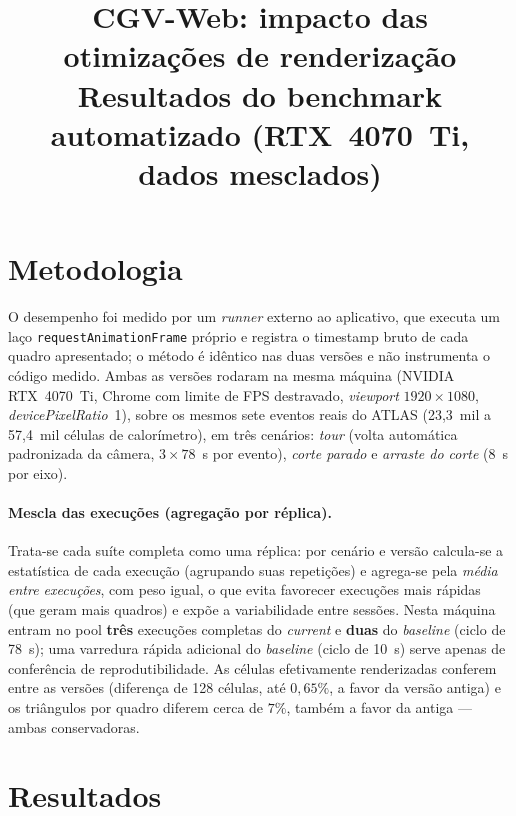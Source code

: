 \documentclass[11pt,a4paper]{article}
\title{CGV-Web: impacto das otimiza\c{c}\~oes de renderiza\c{c}\~ao\\ \large Resultados do benchmark automatizado (RTX~4070~Ti, dados mesclados)}
\author{}
\date{}
\begin{document}
\maketitle

\section{Metodologia}

O desempenho foi medido por um \emph{runner} externo ao aplicativo, que executa um la\c{c}o
\texttt{request\-Animation\-Frame} pr\'oprio e registra o timestamp bruto de cada quadro
apresentado; o m\'etodo \'e id\^entico nas duas vers\~oes e n\~ao instrumenta o c\'odigo medido.
Ambas as vers\~oes rodaram na mesma m\'aquina (NVIDIA RTX~4070~Ti, Chrome com limite de FPS
destravado, \emph{viewport} $1920\times1080$, \emph{devicePixelRatio}~1), sobre os mesmos sete
eventos reais do ATLAS (23{,}3~mil a 57{,}4~mil c\'elulas de calor\'imetro), em tr\^es
cen\'arios: \emph{tour} (volta autom\'atica padronizada da c\^amera, $3\times78$~s por evento),
\emph{corte parado} e \emph{arraste do corte} (8~s por eixo).

\paragraph{Mescla das execu\c{c}\~oes (agrega\c{c}\~ao por r\'eplica).}
Trata-se cada su\'ite completa como uma r\'eplica: por cen\'ario e vers\~ao calcula-se a
estat\'istica de cada execu\c{c}\~ao (agrupando suas repeti\c{c}\~oes) e agrega-se pela
\emph{m\'edia entre execu\c{c}\~oes}, com peso igual, o que evita favorecer execu\c{c}\~oes mais
r\'apidas (que geram mais quadros) e exp\~oe a variabilidade entre sess\~oes. Nesta m\'aquina
entram no pool \textbf{tr\^es} execu\c{c}\~oes completas do \emph{current} e \textbf{duas} do
\emph{baseline} (ciclo de 78~s); uma varredura r\'apida adicional do \emph{baseline} (ciclo de
10~s) serve apenas de confer\^encia de reprodutibilidade. As c\'elulas efetivamente
renderizadas conferem entre as vers\~oes (diferen\c{c}a de 128 c\'elulas, at\'e $0{,}65\%$, a
favor da vers\~ao antiga) e os tri\^angulos por quadro diferem cerca de $7\%$, tamb\'em a favor
da antiga --- ambas conservadoras.

\section{Resultados}
\end{document}
